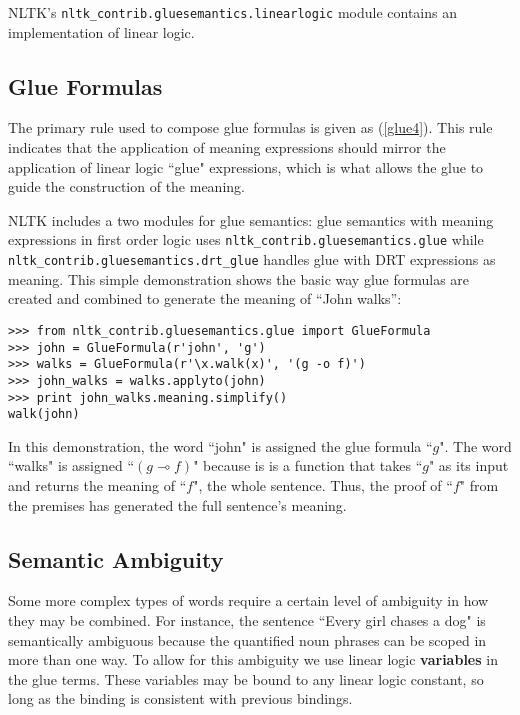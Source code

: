 \documentclass{article}
\newcommand{\dhgcode}[1]{{\tt #1}}
\begin{document}

NLTK's \dhgcode{nltk\_contrib.gluesemantics.linearlogic} module contains an implementation of linear logic.

\subsection{Glue Formulas}
The primary rule used to compose glue formulas is given as (\ref{glue4}).  This rule indicates that the application of meaning expressions should mirror the application of linear logic ``glue" expressions, which is what allows the glue to guide the construction of the meaning.


NLTK includes a two modules for glue semantics: glue semantics with meaning expressions in first order logic uses \dhgcode{nltk\_contrib.gluesemantics.glue} while \dhgcode{nltk\_contrib.gluesemantics.drt\_glue} handles glue with DRT expressions as meaning.  This simple demonstration shows the basic way glue formulas are created and combined to generate the meaning of ``John walks'':

\begin{verbatim}
>>> from nltk_contrib.gluesemantics.glue import GlueFormula
>>> john = GlueFormula(r'john', 'g')
>>> walks = GlueFormula(r'\x.walk(x)', '(g -o f)')
>>> john_walks = walks.applyto(john)
>>> print john_walks.meaning.simplify()
walk(john)
\end{verbatim}

In this demonstration, the word ``john" is assigned the glue formula ``$g$".  The word ``walks" is assigned ``$(g \multimap f)$" because is is a function that takes ``$g$" as its input and returns the meaning of ``$f$", the whole sentence.  Thus, the proof of ``$f$" from the premises has generated the full sentence's meaning.

\subsection{Semantic Ambiguity}

Some more complex types of words require a certain level of ambiguity in how they may be combined.  For instance, the sentence ``Every girl chases a dog" is semantically ambiguous because the quantified noun phrases can be scoped in more than one way.  To allow for this ambiguity we use linear logic \textbf{variables} in the glue terms.  These variables may be bound to any linear logic constant, so long as the binding is consistent with previous bindings.
\end{document}
